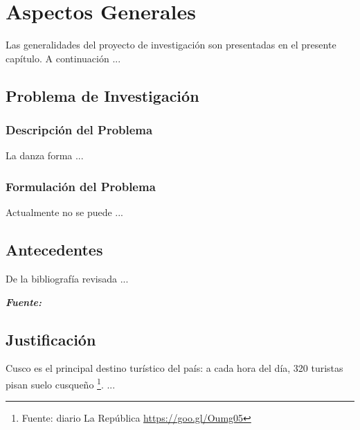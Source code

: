 \chapter{Aspectos Generales}
Las generalidades del proyecto de investigación son presentadas en el presente capítulo. A continuación ...

\section{Problema de Investigación}

\label{sec:problema}
\subsection{Descripción del Problema}


La danza forma ...

\subsection{Formulación del Problema}
Actualmente no se puede ...

\section{Antecedentes}

De la bibliografía revisada ...

\begin{table}[H]
 \label{table:chlearn:methods}
\footnotesize\it{\textbf{Fuente: } \cite{escalera:2015:cultural-event}}    
\end{table} 


\section{Justificación}
\label{sec:justificacion}
Cusco es el principal destino turístico del país: a cada hora del día, 320 turistas pisan suelo cusqueño \footnote{Fuente: diario La República \url{https://goo.gl/Oumg05}}. ...
